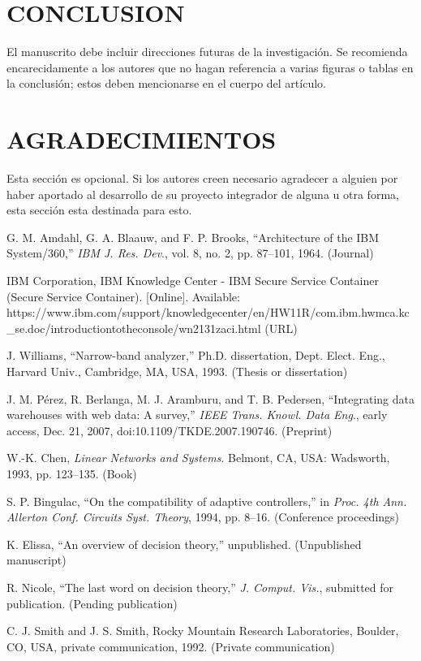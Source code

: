 \documentclass{IEEEcsmag}
\begin{document}
\section{CONCLUSION}
El manuscrito debe incluir direcciones futuras de la investigación. Se recomienda encarecidamente a los autores que no hagan referencia a varias figuras o tablas en la conclusión; estos deben mencionarse en el cuerpo del artículo.
\vspace*{-8pt}


\section{AGRADECIMIENTOS}
Esta sección es opcional. Si los autores creen necesario agradecer a alguien por haber aportado al desarrollo de su proyecto integrador de alguna u otra forma, esta sección esta destinada para esto.


\def\refname{REFERENCES}

\begin{thebibliography}{1}

G. M. Amdahl, G. A. Blaauw, and F. P. Brooks, ``Architecture of the IBM System/360,'' {\it IBM J. Res. Dev}., vol. 8, no. 2, pp. 87--101, 1964. (Journal)

IBM Corporation, IBM Knowledge Center - IBM Secure Service Container (Secure Service Container). [Online]. Available: {https://www.ibm.com/support/\break knowledgecenter/en/HW11R/com.ibm.hwmca.kc\_se.doc/\break introductiontotheconsole/wn2131zaci.html} (URL)

J. Williams, ``Narrow-band analyzer,'' Ph.D. dissertation, Dept.  Elect. Eng., Harvard Univ., Cambridge, MA, USA, 1993. (Thesis or dissertation)

J. M. P\'erez, R. Berlanga, M. J. Aramburu, and T. B. Pedersen, ``Integrating data warehouses with web data: A survey,'' {\it IEEE Trans. Knowl. Data Eng}., early access, Dec. 21, 2007, doi:10.1109/TKDE.2007.190746. (Preprint)

W.-K. Chen, {\it Linear Networks and Systems}. Belmont, CA, USA: Wadsworth,  1993, pp. 123--135. (Book)

S. P. Bingulac, ``On the compatibility of adaptive controllers,'' in {\it Proc. 4th Ann. Allerton Conf. Circuits Syst. Theory}, 1994,  pp. 8--16. (Conference proceedings)

K. Elissa, ``An overview of decision theory,'' unpublished. (Unpublished manuscript)

R. Nicole, ``The last word on decision theory,'' {\it J. Comput. Vis.}, submitted for publication. (Pending publication)

C. J. Smith and J. S. Smith, Rocky Mountain Research Laboratories, Boulder, CO, USA, private communication, 1992. (Private communication)
\end{thebibliography}\vspace*{-8pt}
\end{document}
